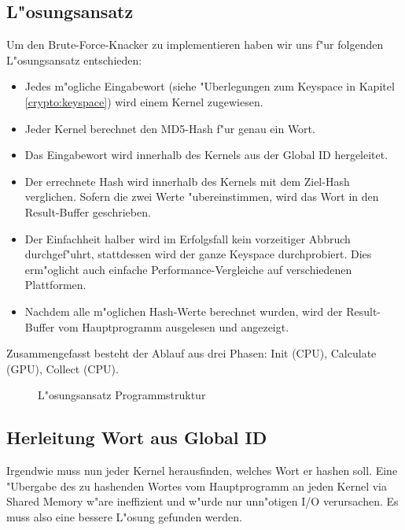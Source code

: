 \begin{refsection}



\section{L"osungsansatz}


Um den Brute-Force-Knacker zu implementieren haben wir uns f"ur folgenden
L"osungsansatz entschieden:

\begin{itemize}
	\item Jedes m"ogliche Eingabewort (siehe "Uberlegungen zum Keyspace in Kapitel
		\ref{crypto:keyspace}) wird einem Kernel zugewiesen.
	\item Jeder Kernel berechnet den MD5-Hash f"ur genau ein Wort.
	\item Das Eingabewort wird innerhalb des Kernels aus der Global ID
		hergeleitet.
	\item Der errechnete Hash wird innerhalb des Kernels mit dem Ziel-Hash
		verglichen. Sofern die zwei Werte "ubereinstimmen, wird das Wort in den
		Result-Buffer geschrieben.
	\item Der Einfachheit halber wird im Erfolgsfall kein vorzeitiger Abbruch
		durchgef"uhrt, stattdessen wird der ganze Keyspace durchprobiert. Dies
		erm"oglicht auch einfache Performance-Vergleiche auf verschiedenen
		Plattformen.
	\item Nachdem alle m"oglichen Hash-Werte berechnet wurden, wird der
		Result-Buffer vom Hauptprogramm ausgelesen und angezeigt.
\end{itemize}

\noindent Zusammengefasst besteht der Ablauf aus drei Phasen: Init (CPU),
Calculate (GPU), Collect (CPU).

\begin{figure}[H]
	\centering
	
	\caption{L"osungsansatz Programmstruktur}
	\label{img:crypto:programm-struktur}
\end{figure}

\subsection{Herleitung Wort aus Global ID}

Irgendwie muss nun jeder Kernel herausfinden, welches Wort er hashen soll. Eine
"Ubergabe des zu hashenden Wortes vom Hauptprogramm an jeden Kernel via Shared
Memory w"are ineffizient und w"urde nur unn"otigen I/O verursachen. Es muss also
eine bessere L"osung gefunden werden.


\end{refsection}

